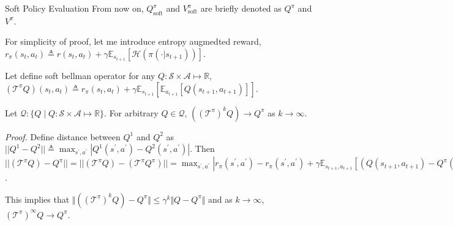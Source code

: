 \documentclass[8pt]{beamer}
\begin{document}
\begin{frame}{Soft Policy Evaluation}
    From now on, $Q^\pi_\text{soft}$ and $V^\pi_\text{soft}$ are briefly denoted as $Q^\pi$ and $V^\pi$.
    \newline

    For simplicity of proof, let me introduce entropy augmedted reward, $r_\pi(s_t, a_t) \triangleq r(s_t,a_t) + \gamma \mathbb{E}_{s_{t+1}}[\mathcal{H}(\pi(\cdot | s_{t+1}))]$.

    Let define soft bellman operator for any $Q: \mathcal{S}\times \mathcal{A} \mapsto \mathbb{R}$, $(\mathcal{T}^\pi Q) (s_t,a_t) \triangleq r_\pi(s_t,a_t) + \gamma \mathbb{E}_{s_{t+1}}[\mathbb{E}_{a_{t+1}}[ Q(s_{t+1}, a_{t+1})]]$.

    \begin{theorem}
        Let $\mathcal{Q}: \{Q \mid Q: \mathcal{S}\times\mathcal{A} \mapsto \mathbb{R} \}$. For arbitrary $Q \in \mathcal{Q}$,
        $((\mathcal{T}^\pi)^k Q) \rightarrow Q^\pi$ as $k \rightarrow \infty$. 
        

    \end{theorem}
    \textit{Proof.}
        Define distance  between $Q^1$ and $Q^2$ as $||Q^1 - Q^2|| \triangleq \max_{s^\prime, a^\prime} |Q^1(s^\prime,a^\prime) - Q^2(s^\prime, a^\prime)|$.
        Then
        \(||(\mathcal{T}^\pi Q) - Q^\pi|| = ||(\mathcal{T}^\pi Q)- (\mathcal{T}^\pi Q^\pi)|| = \max_{s^\prime, a^\prime} \left| r_\pi(s^\prime,a^\prime) - r_\pi(s^\prime, a^\prime) + \gamma \mathbb{E}_{s_{t+1}, a_{t+1}}[(Q(s_{t+1}, a_{t+1}) - Q^\pi(s_{t+1}, a_{t+1}))] \right| \leq \gamma \max_{s^\prime, a^\prime} \vert Q(s^\prime, a^\prime) - Q^\pi(s^\prime, a^\prime) \vert\).

        This implies that \( \Vert ((\mathcal{T}^\pi)^k Q) - Q^\pi \Vert \leq \gamma^k \Vert Q - Q^\pi \Vert \) and as \( k \rightarrow \infty\), \((\mathcal{T}^\pi)^\infty Q \rightarrow Q^\pi\).

\end{frame}
\end{document}
